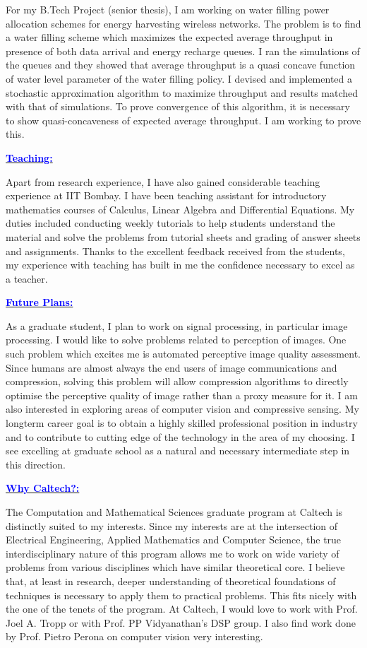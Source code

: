 \documentclass[11pt]{article}
\newcommand{\statement}[1]{\par\medskip
  \underline{\textcolor{blue}{\textbf{#1:}}}\space
}
\begin{document}
For my B.Tech Project (senior thesis), I am working on water filling power allocation schemes for energy harvesting wireless networks. 
The problem is to find a water filling scheme which maximizes the expected average throughput in presence of both data arrival and energy recharge queues. 
I ran the simulations of the queues and they showed that average throughput is a quasi concave function of water level parameter of the water filling policy. 
I devised and implemented a stochastic approximation algorithm to maximize throughput and results matched with that of simulations. 
To prove convergence of this algorithm, it is necessary to show quasi-concaveness of expected average throughput. I am working to prove this.

\statement{Teaching}
Apart from research experience, I have also gained considerable teaching experience at IIT Bombay. 
I have been teaching assistant for introductory mathematics courses of Calculus, Linear Algebra and Differential Equations. 
My duties included conducting weekly tutorials to help students understand the material and solve the problems from tutorial sheets and grading of answer sheets and assignments.
Thanks to the excellent feedback received from the students, my experience with teaching has built in me the confidence necessary to excel as a teacher.

\statement{Future Plans}
As a graduate student, I plan to work on signal processing, in particular image processing. 
I would like to solve problems related to perception of images. One such problem which excites me is automated perceptive image quality assessment.
Since humans are almost always the end users of image communications and compression, solving this problem will allow compression algorithms to directly optimise the perceptive quality of image rather than a proxy measure for it. 
I am also interested in exploring areas of computer vision and compressive sensing. 
My longterm career goal is to obtain a highly skilled professional position in industry and to contribute to cutting edge of the technology in the area of my choosing. 
I see excelling at graduate school as a natural and necessary intermediate step in this direction.

\statement{Why Caltech?}
The Computation and Mathematical Sciences graduate program at Caltech is distinctly suited to my interests. 
Since my interests are at the intersection of Electrical Engineering, Applied Mathematics and Computer Science, the true interdisciplinary nature of this program allows me to work on wide variety of problems from various disciplines which have similar theoretical core. 
I believe that, at least in research, deeper understanding of theoretical foundations of techniques is necessary to apply them to practical problems. 
This fits nicely with the one of the tenets of the program. 
At Caltech, I would love to work with Prof. Joel A. Tropp or with Prof. PP Vidyanathan's DSP group. I also find work done by Prof. Pietro Perona on computer vision very interesting.
\end{document}

